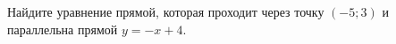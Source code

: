 \begin{ex}
	\begin{condition}
		Найдите уравнение прямой, которая проходит через точку $(-5;3)$ и параллельна прямой $y=-x+4$.
	\end{condition}
\end{ex}